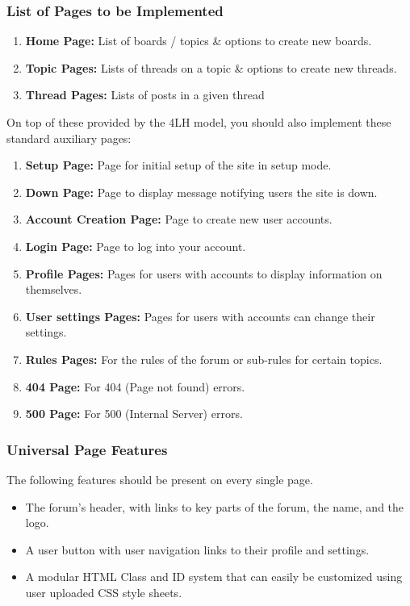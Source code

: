 \documentclass[]{article}
\begin{document}
\subsubsection{List of Pages to be Implemented}\label{Pages to implement}
\begin{enumerate}
    \item \textbf{Home Page:} List of boards / topics & options to create new boards.
    \item \textbf{Topic Pages:} Lists of threads on a topic & options to create new threads.
    \item \textbf{Thread Pages:} Lists of posts in a given thread
\end{enumerate}
On top of these provided by the 4LH model, you should also implement these standard auxiliary pages:
\begin{enumerate}
    \item \textbf{Setup Page:} Page for initial setup of the site in setup mode.
    \item \textbf{Down Page:} Page to display message notifying users the site is down.
    \item \textbf{Account Creation Page:} Page to create new user accounts.
    \item \textbf{Login Page:} Page to log into your account.
    \item \textbf{Profile Pages:} Pages for users with accounts to display information on themselves.
    \item \textbf{User settings Pages:} Pages for users with accounts can change their settings.
    \item \textbf{Rules Pages:} For the rules of the forum or sub-rules for certain topics. 
    \item \textbf{404 Page:} For 404 (Page not found) errors. 
    \item \textbf{500 Page:} For 500 (Internal Server) errors.
\end{enumerate}

\subsubsection{Universal Page Features}\label{uni}
The following features should be present on every single page.
\begin{itemize}
    \item The forum's header, with links to key parts of the forum, the name, and the logo.
    \item A user button with user navigation links to their profile and settings.
    \item A modular HTML Class and ID system that can easily be customized using user uploaded CSS style sheets.
\end{itemize}
\end{document}
